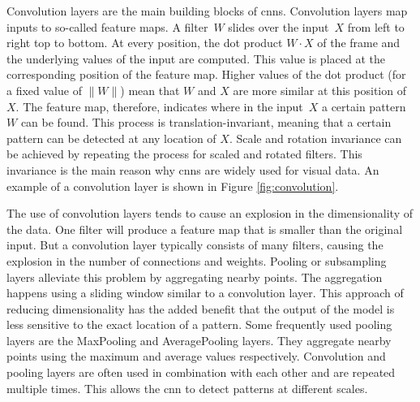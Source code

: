\begin{minipage}{\textwidth}
Convolution layers \cite{mnist} are the main building blocks of \glspl{cnn}. Convolution layers map inputs to so-called feature maps. A filter~$W$ slides over the input~$X$ from left to right top to bottom. At every position, the dot product $W\cdot X$ of the frame and the underlying values of the input are computed. This value is placed at the corresponding position of the feature map. Higher values of the dot product (for a fixed value of $\|W\|$) mean that $W$ and $X$ are more similar at this position of $X$. The feature map, therefore, indicates where in the input~$X$ a certain pattern~$W$ can be found. This process is translation-invariant, meaning that a certain pattern can be detected at any location of $X$. Scale and rotation invariance can be achieved by repeating the process for scaled and rotated filters. This invariance is the main reason why \glspl{cnn} are widely used for visual data. An example of a convolution layer is shown in Figure \ref{fig:convolution}.\\
\end{minipage}


\begin{minipage}{\textwidth}
The use of convolution layers tends to cause an explosion in the dimensionality of the data. One filter will produce a feature map that is smaller than the original input. But a convolution layer typically consists of many filters, causing the explosion in the number of connections and weights. Pooling or subsampling layers \cite{mnist} alleviate this problem by aggregating nearby points. The aggregation happens using a sliding window similar to a convolution layer. This approach of reducing dimensionality has the added benefit that the output of the model is less sensitive to the exact location of a pattern. Some frequently used pooling layers are the MaxPooling and AveragePooling layers. They aggregate nearby points using the maximum and average values respectively. Convolution and pooling layers are often used in combination with each other and are repeated multiple times. This allows the \gls{cnn} to detect patterns at different scales.\\
\end{minipage}

 





